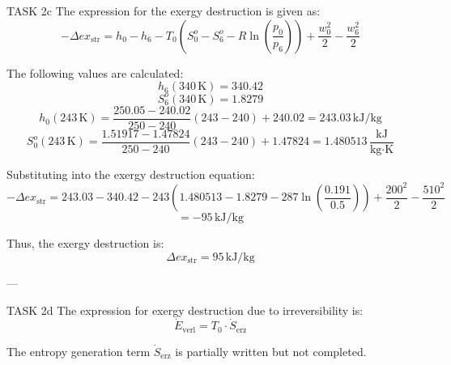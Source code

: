 TASK 2c  
The expression for the exergy destruction is given as:  
\[
-\Delta ex_{\text{str}} = h_0 - h_6 - T_0(S_0^o - S_6^o - R \ln \left(\frac{p_0}{p_6}\right)) + \frac{w_0^2}{2} - \frac{w_6^2}{2}
\]  

The following values are calculated:  
\[
h_6(340 \, \text{K}) = 340.42
\]  
\[
S_6^o(340 \, \text{K}) = 1.8279
\]  
\[
h_0(243 \, \text{K}) = \frac{250.05 - 240.02}{250 - 240} (243 - 240) + 240.02 = 243.03 \, \text{kJ/kg}
\]  
\[
S_0^o(243 \, \text{K}) = \frac{1.51917 - 1.47824}{250 - 240} (243 - 240) + 1.47824 = 1.480513 \, \frac{\text{kJ}}{\text{kg·K}}
\]  

Substituting into the exergy destruction equation:  
\[
-\Delta ex_{\text{str}} = 243.03 - 340.42 - 243(1.480513 - 1.8279 - 287 \ln \left(\frac{0.191}{0.5}\right)) + \frac{200^2}{2} - \frac{510^2}{2}
\]  
\[
= -95 \, \text{kJ/kg}
\]  

Thus, the exergy destruction is:  
\[
\Delta ex_{\text{str}} = 95 \, \text{kJ/kg}
\]  

---

TASK 2d  
The expression for exergy destruction due to irreversibility is:  
\[
\dot{E}_{\text{verl}} = T_0 \cdot \dot{S}_{\text{erz}}
\]  

The entropy generation term \( \dot{S}_{\text{erz}} \) is partially written but not completed.